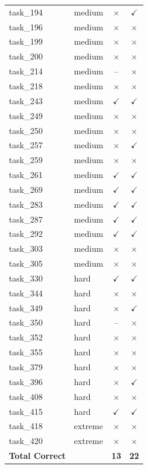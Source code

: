 \begin{table}[ht]
\begin{tabular}{llcc}
task\_194 & medium  & $\times$ & $\checkmark$ \\
task\_196 & medium  & $\times$ & $\times$ \\
task\_199 & medium  & $\times$ & $\times$ \\
task\_200 & medium  & $\times$ & $\times$ \\
task\_214 & medium  & -- & $\times$ \\
task\_218 & medium  & $\times$ & $\times$ \\
task\_243 & medium  & $\checkmark$ & $\checkmark$ \\
task\_249 & medium  & $\times$ & $\times$ \\
task\_250 & medium  & $\times$ & $\times$ \\
task\_257 & medium  & $\times$ & $\checkmark$ \\
task\_259 & medium  & $\times$ & $\times$ \\
task\_261 & medium  & $\checkmark$ & $\checkmark$ \\
task\_269 & medium  & $\checkmark$ & $\checkmark$ \\
task\_283 & medium  & $\checkmark$ & $\checkmark$ \\
task\_287 & medium  & $\checkmark$ & $\checkmark$ \\
task\_292 & medium  & $\checkmark$ & $\checkmark$ \\
task\_303 & medium  & $\times$ & $\times$ \\
task\_305 & medium  & $\times$ & $\times$ \\
\midrule
task\_330 & hard    & $\checkmark$ & $\checkmark$ \\
task\_344 & hard    & $\times$ & $\times$ \\
task\_349 & hard    & $\times$ & $\checkmark$ \\
task\_350 & hard    & -- & $\times$ \\
task\_352 & hard    & $\times$ & $\times$ \\
task\_355 & hard    & $\times$ & $\times$ \\
task\_379 & hard    & $\times$ & $\times$ \\
task\_396 & hard    & $\times$ & $\checkmark$ \\
task\_408 & hard    & $\times$ & $\times$ \\
task\_415 & hard    & $\checkmark$ & $\checkmark$ \\
\midrule
task\_418 & extreme & $\times$ & $\times$ \\
task\_420 & extreme & $\times$ & $\times$ \\
\midrule
\textbf{Total Correct} & & \textbf{13} & \textbf{22} \\
\bottomrule
\end{tabular}
\end{table}


